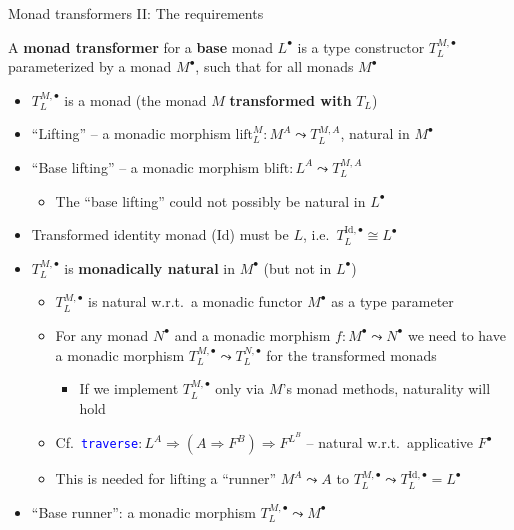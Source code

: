 \documentclass[english]{beamer}
\begin{document}
\begin{frame}{Monad transformers II: The requirements}

{\footnotesize{}\vspace{-0.1cm}}A \textbf{monad transformer} for
a \textbf{base} monad $L^{\bullet}$ is a type constructor $T_{L}^{M,\bullet}$
parameterized by a monad $M^{\bullet}$, such that for all monads
$M^{\bullet}$
\begin{itemize}
\item $T_{L}^{M,\bullet}$ is a monad (the monad $M$ \textbf{transformed
with} $T_{L}$)
\item ``Lifting'' -- a monadic morphism $\text{lift}_{L}^{M}:M^{A}\leadsto T_{L}^{M,A}$,
natural in $M^{\bullet}$
\item ``Base lifting'' -- a monadic morphism $\text{blift}:L^{A}\leadsto T_{L}^{M,A}$
\begin{itemize}
\item The ``base lifting'' could not possibly be natural in $L^{\bullet}$
\end{itemize}
\item Transformed identity monad ($\text{Id}$) must be $L$, i.e.~$T_{L}^{\text{Id},\bullet}\cong L^{\bullet}$
\item $T_{L}^{M,\bullet}$ is \textbf{monadically natural} in $M^{\bullet}$
(but not in $L^{\bullet}$)
\begin{itemize}
\item $T_{L}^{M,\bullet}$ is natural w.r.t.~a monadic functor $M^{\bullet}$
as a type parameter
\item For any monad $N^{\bullet}$ and a monadic morphism $f:M^{\bullet}\leadsto N^{\bullet}$
we need to have a monadic morphism $T_{L}^{M,\bullet}\leadsto T_{L}^{N,\bullet}$
for the transformed monads
\begin{itemize}
\item If we implement $T_{L}^{M,\bullet}$ only via $M$'s monad methods,
naturality will hold 
\end{itemize}
\item Cf.~\texttt{\textcolor{blue}{\footnotesize{}traverse}}{\small{}$:L^{A}\Rightarrow\left(A\Rightarrow F^{B}\right)\Rightarrow F^{L^{B}}$
-- natural w.r.t.~applicative $F^{\bullet}$}{\small\par}
\item This is needed for lifting a ``runner'' $M^{A}\leadsto A$ to $T_{L}^{M,\bullet}\leadsto T_{L}^{\text{Id},\bullet}=L^{\bullet}$
\end{itemize}
\item ``Base runner'': a monadic morphism $T_{L}^{M,\bullet}\leadsto M^{\bullet}$
\end{itemize}
\end{frame}
\end{document}
